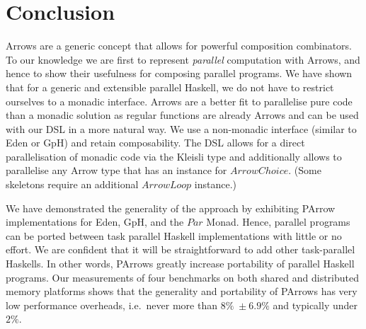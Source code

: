 \documentclass{jfp1}
\newcommand{\Conid}[1]{\mathit{#1}}
\DeclareRobustCommand{\hairspn}{\hspace{1pt}\nolinebreak}%
\DeclareRobustCommand{\ie}{{i.\hairspn{}e.~}}
\begin{document}
\section{Conclusion}
\label{sec:conclusion}
Arrows are a generic concept that allows for powerful composition
combinators. To our knowledge we are first to represent
\emph{parallel} computation with
Arrows, and hence to show their usefulness for
composing parallel
programs. We have shown that for a generic and extensible parallel Haskell, we do not have to restrict ourselves to a monadic interface. %
Arrows are a better fit to parallelise pure code than a monadic solution as regular functions are already Arrows and can be used with our DSL in a more natural way. %
We use a non-monadic interface (similar to Eden or GpH) and retain composability.
%
The DSL allows for a direct parallelisation of monadic code via the Kleisli type and additionally allows to parallelise any Arrow type that has an instance for \ensuremath{\Conid{ArrowChoice}}. (Some skeletons require an additional \ensuremath{\Conid{ArrowLoop}} instance.)


We have demonstrated the generality of the approach by exhibiting PArrow implementations for Eden, GpH, and the \ensuremath{\Conid{Par}} Monad. Hence, parallel programs can be ported between task parallel Haskell implementations with little or no effort. We are confident that it will be straightforward to add other task-parallel Haskells.
%
In other words, PArrows greatly increase portability of parallel Haskell programs.
%
%
Our measurements of four benchmarks on both shared and distributed memory platforms shows that the generality and portability of PArrows has very low performance overheads, \ie never more than $8\% \; \pm 6.9\%$ and typically under $2\%$.
\end{document}
